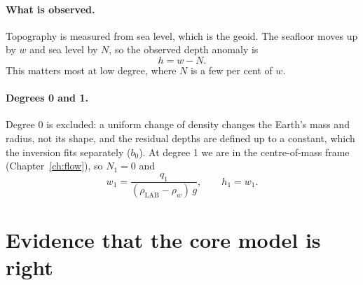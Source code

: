 \paragraph{What is observed.}
Topography is measured from sea level, which is the geoid.
The seafloor moves up by $w$ and sea level by $N$, so the observed depth anomaly is
\begin{equation}
    h = w - N .
\end{equation}
This matters most at low degree, where $N$ is a few per cent of $w$.

\paragraph{Degrees 0 and 1.}
Degree 0 is excluded: a uniform change of density changes the Earth's mass and radius, not its shape, and the residual depths are defined up to a constant, which the inversion fits separately ($b_0$).
At degree 1 we are in the centre-of-mass frame (Chapter~\ref{ch:flow}), so $N_1 = 0$ and
\begin{equation}
    w_1 = \frac{q_1}{(\rho_{\mathrm{LAB}}-\rho_w)\,g}, \qquad h_1 = w_1 .
\end{equation}

\section{Evidence that the core model is right}

